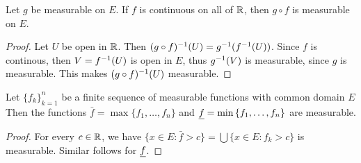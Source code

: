\begin{theorem}\label{9.1.7}
    Let $g$ be measurable on  $E$. If  $f$ is continuous on all of  $\mathbb{R}$, then
    $g \circ f$ is measurable on  $E$.
\end{theorem}
\begin{proof}
    Let $U$ be open in $\mathbb{R}$. Then $(g \circ f)^{-1}(U)=g^{-1}(f^{-1}(U))$.
    Since $f$ is continous, then $V=f^{-1}(U)$ is open in $E$, thus
    $g^{-1}(V)$ is measurable, since $g$ is measurable. This makes  $(g
    \circ f)^{-1}(U)$ measurable.
\end{proof}

\begin{theorem}\label{9.1.8}
    Let $\{f_k\}_{k=1}^n$ be a finite sequence of measurable functions with
    common domain $E$ Then the functions $\bar{f}=\max{\{f_1, \dots, f_n\}}$ and
    $\underline{f}=\min{\{f_1, \dots, f_n\}}$ are measurable.
\end{theorem}
\begin{proof}
    For every $c \in \mathbb{R}$, we have $\{x \in E : \bar{f}>c\}=\bigcup{\{x \in E :
    f_k>c\}}$ is measurable. Similar follows for $\underline{f}$.
\end{proof}
